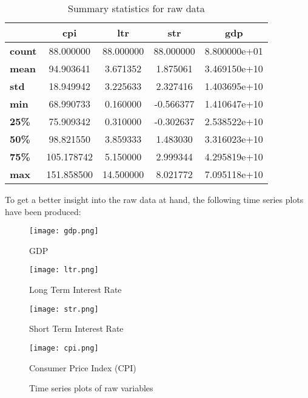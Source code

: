 \documentclass[12pt]{article}
\begin{document}
\begin{table}[H]
    \centering
    \begin{tabular}{lcccc}
        \hline
        & \textbf{cpi} & \textbf{ltr} & \textbf{str} & \textbf{gdp} \\
        \hline
        \textbf{count} & 88.000000 & 88.000000 & 88.000000 & 8.800000e+01 \\
        \textbf{mean} & 94.903641 & 3.671352 & 1.875061 & 3.469150e+10 \\
        \textbf{std} & 18.949942 & 3.225633 & 2.327416 & 1.403695e+10 \\
        \textbf{min} & 68.990733 & 0.160000 & -0.566377 & 1.410647e+10 \\
        \textbf{25\%} & 75.909342 & 0.310000 & -0.302637 & 2.538522e+10 \\
        \textbf{50\%} & 98.821550 & 3.859333 & 1.483030 & 3.316023e+10 \\
        \textbf{75\%} & 105.178742 & 5.150000 & 2.999344 & 4.295819e+10 \\
        \textbf{max} & 151.858500 & 14.500000 & 8.021772 & 7.095118e+10 \\
        \hline
    \end{tabular}
    \caption{Summary statistics for raw data}
    \label{tab:summary_statistics}
\end{table}


To get a better insight into the raw data at hand, the following time series plots have been produced:

\begin{figure}[H]
    \centering
    \begin{minipage}[b]{0.45\textwidth}
        \centering
        \texttt{[image: gdp.png]}
        \caption{GDP}
        \label{fig:gdp}
    \end{minipage}
    \hfill
    \begin{minipage}[b]{0.45\textwidth}
        \centering
        \texttt{[image: ltr.png]}
        \caption{Long Term Interest Rate}
        \label{fig:ltr}
    \end{minipage}
    \vfill
    \begin{minipage}[b]{0.45\textwidth}
        \centering
        \texttt{[image: str.png]}
        \caption{Short Term Interest Rate}
        \label{fig:str}
    \end{minipage}
    \hfill
    \begin{minipage}[b]{0.45\textwidth}
        \centering
        \texttt{[image: cpi.png]}
        \caption{Consumer Price Index (CPI)}
        \label{fig:subfig4}
    \end{minipage}
    \caption{Time series plots of raw variables}
    \label{fig:mainfigure}
\end{figure}
\end{document}
